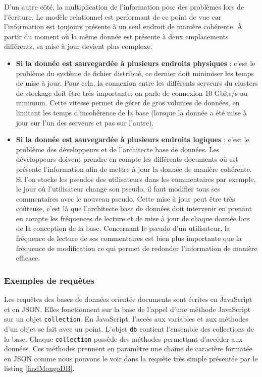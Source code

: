   D'un autre côté, la multiplication de l'information pose des problèmes lors de l'écriture. Le modèle relationnel est performant de ce point de vue car l'information est toujours présente à un seul endroit de manière cohérente. À partir du moment où la même donnée est présente à deux emplacements différents, sa mise à jour devient plus complexe.\\

  \begin{itemize}
    \item \textbf{Si la donnée est sauvegardée à plusieurs endroits physiques} : c'est le problème du système de fichier distribué, ce dernier doit minimiser les temps de mise à jour. Pour cela, la connexion entre les différents serveurs du clusters de stockage doit être très importante, on parle de connexion 10 Gbits/s au minimum. Cette vitesse permet de gérer de gros volumes de données, en limitant les temps d'incohérence de la base (lorsque la donnée a été mise à jour sur l'un des serveurs et pas sur l'autre).
    \item \textbf{Si la donnée est sauvegardée à plusieurs endroits logiques} : c'est le problème des développeurs et de l'architecte base de données. Les développeurs doivent prendre en compte les différents documents où est présente l'information afin de mettre à jour la donnée de manière cohérente. Si l'on stocke les pseudos des utilisateurs dans les commentaires par exemple, le jour où l'utilisateur change son pseudo, il faut modifier tous ses commentaires avec le nouveau pseudo. Cette mise à jour peut être très coûteuse, c'est là que l'architecte base de données doit intervenir en prenant en compte les fréquences de lecture et de mise à jour de chaque donnée lors de la conception de la base. Concernant le pseudo d'un utilisateur, la fréquence de lecture de ses commentaires est bien plus importante que la fréquence de modification ce qui permet de redonder l'information de manière efficace.
  \end{itemize}

\subsubsection{Exemples de requêtes}

  Les requêtes des bases de données orientée documents sont écrites en JavaScript et en JSON. Elles fonctionnent sur la base de l'appel d'une méthode JavaScript sur un objet \verb|collection|. En JavaScript, l'accès aux variables et aux méthodes d'un objet se fait avec un point. L'objet \verb|db| contient l'ensemble des collections de la base. Chaque \verb|collection| possède des méthodes permettant d'accéder aux données. Ces méthodes prennent en paramètre une chaîne de caractère formatée en JSON comme nous pouvons le voir dans la requête très simple présentée par le listing \ref{findMongoDB}.

